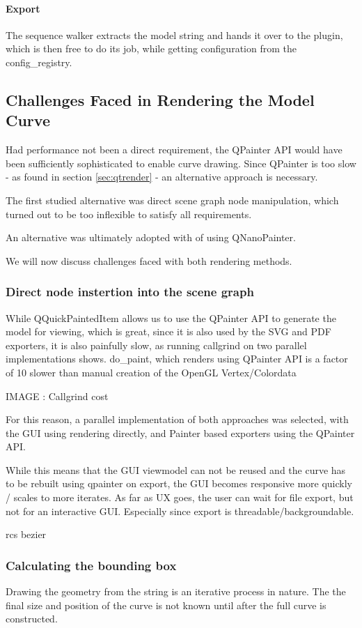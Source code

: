 \paragraph{Export} The sequence walker extracts the model string and hands it over to the plugin, which is then free to do its job, while getting configuration from the config\_registry.

\subsection{Challenges Faced in Rendering the Model Curve}
Had performance not been a direct requirement, the QPainter API would have been sufficiently sophisticated to enable curve drawing. Since QPainter is too slow - as found in section \ref{sec:qtrender} - an alternative approach is necessary.

The first studied alternative was direct scene graph node manipulation, which turned out to be too inflexible to satisfy all requirements.

An alternative was ultimately adopted with of using QNanoPainter.

We will now discuss challenges faced with both rendering methods.

\subsubsection{Direct node instertion into the scene graph}
While QQuickPaintedItem allows us to use the QPainter API to generate the model for viewing, which is great, since it is also used by the SVG and PDF exporters, it is also painfully slow, as running callgrind on two parallel implementations shows.
do\_paint, which renders using QPainter API is a factor of 10 slower than manual creation of the OpenGL Vertex/Colordata

IMAGE : Callgrind cost

For this reason, a parallel implementation of both approaches was selected, with the GUI using rendering directly, and Painter based exporters using the QPainter API.

While this means that the GUI viewmodel can not be reused and the curve has to be rebuilt using qpainter on export, the GUI becomes responsive more quickly / scales to more iterates. As far as UX goes, the user can wait for file export, but not for an interactive GUI.
Especially since export is threadable/backgroundable.

rcs bezier
\subsubsection{Calculating the bounding box}
Drawing the geometry from the string is an iterative process in nature. The the final size and position of the curve is not known until after the full curve is constructed.

